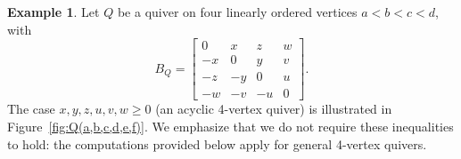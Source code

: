 \documentclass[11pt, letterpaper]{amsart}
\theoremstyle{definition}
\newtheorem{example}[theorem]{Example}
\numberwithin{equation}{section}
\begin{document}
\begin{example}
\label{ex:C(Q)-4vert}
Let $Q$ be a quiver on four linearly ordered vertices $a<b<c<d$, with %
\begin{equation*}
B_Q=\begin{bmatrix} 
0 & x & z & w \\
-x & 0 & y & v \\
-z & -y & 0 & u \\
-w & -v & -u & 0
\end{bmatrix} .
\end{equation*}
The case $x,y,z,u,v,w\ge0$ (an acyclic 4-vertex quiver) is illustrated in 
Figure~\ref{fig:Q(a,b,c,d,e,f)}. 
We emphasize that we do not require these inequalities to hold: 
the computations provided below apply for general 4-vertex quivers. 


\end{example}
\end{document}
